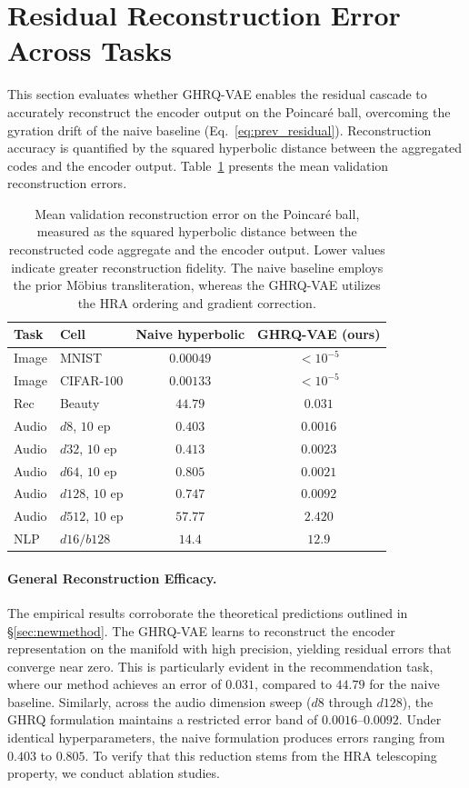 \documentclass[12pt]{report}
\begin{document}
\section{Residual Reconstruction Error Across Tasks}
\label{sec:exp_approx}

This section evaluates whether GHRQ-VAE enables the residual cascade to accurately reconstruct the encoder output on the Poincar\'e ball, overcoming the gyration drift of the naive baseline (Eq.~\ref{eq:prev_residual}). Reconstruction accuracy is quantified by the squared hyperbolic distance between the aggregated codes and the encoder output. Table~\ref{tab:approx} presents the mean validation reconstruction errors.

\begin{table}[H]
\centering
\caption{Mean validation reconstruction error on the Poincar\'e ball, measured as the squared hyperbolic distance between the reconstructed code aggregate and the encoder output. Lower values indicate greater reconstruction fidelity. The naive baseline employs the prior M\"obius transliteration, whereas the GHRQ-VAE utilizes the HRA ordering and gradient correction.}
\label{tab:approx}
\begin{tabular}{llcc}
\hline
Task & Cell & Naive hyperbolic & GHRQ-VAE (ours) \\
\hline
Image  & MNIST            & $0.00049$ & $<\!10^{-5}$ \\
Image  & CIFAR-100        & $0.00133$ & $<\!10^{-5}$ \\
Rec    & Beauty           & $44.79$   & $0.031$ \\
Audio  & $d8$, $10$ ep    & $0.403$   & $0.0016$ \\
Audio  & $d32$, $10$ ep   & $0.413$   & $0.0023$ \\
Audio  & $d64$, $10$ ep   & $0.805$   & $0.0021$ \\
Audio  & $d128$, $10$ ep  & $0.747$   & $0.0092$ \\
Audio  & $d512$, $10$ ep  & $57.77$   & $2.420$ \\
NLP    & $d16/b128$       & $14.4$ & $12.9$ \\
\hline
\end{tabular}
\end{table}

\paragraph{General Reconstruction Efficacy.}
The empirical results corroborate the theoretical predictions outlined in \S\ref{sec:newmethod}. The GHRQ-VAE learns to reconstruct the encoder representation on the manifold with high precision, yielding residual errors that converge near zero. This is particularly evident in the recommendation task, where our method achieves an error of $0.031$, compared to $44.79$ for the naive baseline. Similarly, across the audio dimension sweep ($d8$ through $d128$), the GHRQ formulation maintains a restricted error band of $0.0016$--$0.0092$. Under identical hyperparameters, the naive formulation produces errors ranging from $0.403$ to $0.805$. To verify that this reduction stems from the HRA telescoping property, we conduct ablation studies.
\end{document}
